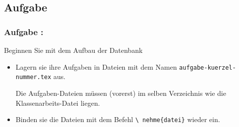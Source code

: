 \documentclass{beamer}
\newcounter{aufgabe}
\begin{document}
\subsection{Aufgabe \theaufgabe}

\begin{frame}
  \frametitle{Aufgabe \theaufgabe:}


  Beginnen Sie mit dem Aufbau der Datenbank

  
  \begin{itemize}
  \item Lagern sie ihre Aufgaben in Dateien mit dem Namen
    \texttt{aufgabe-kuerzel-nummer.tex} aus.

    Die Aufgaben-Dateien müssen (vorerst) im selben Verzeichnis wie
    die Klassenarbeits-Datei liegen.
  \item Binden sie die Dateien mit dem Befehl \texttt{\textbackslash
      nehme\{datei\}} wieder ein.
  \end{itemize}

\end{frame}




\end{document}
